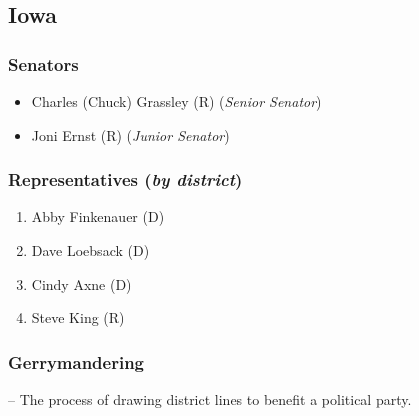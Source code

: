 \documentclass[]{article}
\begin{document}
\subsection*{Iowa}
	\subsubsection*{Senators}
		\begin{itemize}
			\item Charles (Chuck) Grassley (R) (\emph{Senior Senator})
			\item Joni Ernst (R) (\emph{Junior Senator})
		\end{itemize}
	\subsubsection*{Representatives (\emph{by district})}
		\begin{enumerate}
			\item Abby Finkenauer (D)
			\item Dave Loebsack (D)
			\item Cindy Axne (D)
			\item Steve King (R)
		\end{enumerate}

		\subsubsection*{Gerrymandering}
		-- The process of drawing district lines to benefit a political party.
		
\end{document}

